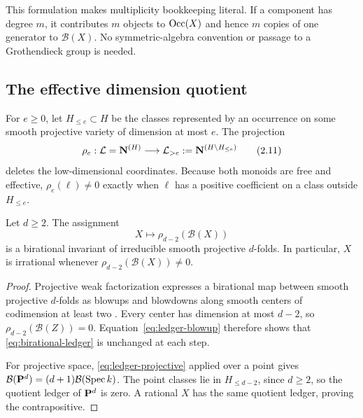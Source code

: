 This formulation makes multiplicity bookkeeping literal.  If a component has
degree $m$, it contributes $m$ objects to \(\operatorname{Occ}(X)\) and hence $m$
copies of one generator to \(\mathcal B(X)\).  No symmetric-algebra convention
or passage to a Grothendieck group is needed.

\subsection{The effective dimension quotient}

For $e\ge0$, let $H_{\le e}\subset H$ be the classes represented by an
occurrence on some smooth projective variety of dimension at most $e$.  The
projection
\[
 \rho_e:\mathcal L=\mathbf N^{(H)}\longrightarrow
 \mathcal L_{>e}:=\mathbf N^{(H\setminus H_{\le e})}
 \tag{2.11}\label{eq:dimension-quotient}
\]
deletes the low-dimensional coordinates.  Because both monoids are free and
effective, \(\rho_e(\ell)\ne0\) exactly when \(\ell\) has a positive
coefficient on a class outside $H_{\le e}$.

\begin{theorem}
\label{thm:birational-quotient}
Let $d\ge2$.  The assignment
\[
 X\longmapsto \rho_{d-2}(\mathcal B(X))
 \tag{2.12}\label{eq:birational-ledger}
\]
is a birational invariant of irreducible smooth projective $d$-folds.
In particular, $X$ is irrational whenever \(\rho_{d-2}(\mathcal B(X))\ne0\).
\end{theorem}

\begin{proof}
Projective weak factorization expresses a birational map between smooth
projective $d$-folds as blowups and blowdowns along smooth centers of
codimension at least two \cite[Theorem~0.1.1]{AKMW}.  Every center has
dimension at most $d-2$, so \(\rho_{d-2}(\mathcal B(Z))=0\).
Equation~\eqref{eq:ledger-blowup} therefore shows that
\eqref{eq:birational-ledger} is unchanged at each step.

For projective space, \eqref{eq:ledger-projective} applied over a point gives
\(\mathcal B(\mathbf P^d)=(d+1)\mathcal B(\operatorname{Spec}k)\).  The point
classes lie in $H_{\le d-2}$, since $d\ge2$, so the quotient ledger of
\(\mathbf P^d\) is zero.  A rational $X$ has the same quotient ledger, proving the
contrapositive.
\end{proof}
